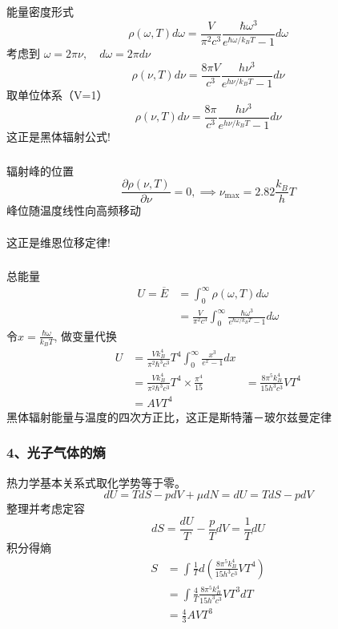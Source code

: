 \begin{frame}
  \frametitle{}
  能量密度形式
  \[ \rho(\omega, T) d \omega = \frac{ V}{\pi ^2c^3} \frac{\hbar\omega^3}{e^{\hbar \omega /k_B T}-1} d \omega\]
  考虑到 $\omega = 2 \pi \nu, \quad d \omega = 2 \pi d\nu $
  \begin{equation*}
    \rho(\nu, T) d \nu=\frac{8 \pi V}{c^{3}} \frac{h \nu^{3}}{e^{h \nu / k_B T}-1} d \nu
  \end{equation*}
  取单位体系（V=1）
  \begin{equation*}
    \rho(\nu, T) d \nu=\frac{8 \pi}{c^{3}} \frac{h \nu^{3}}{e^{h \nu / k_B T}-1} d \nu
  \end{equation*}
  这正是黑体辐射公式!
\end{frame} 

\begin{frame}
  \frametitle{}
  辐射峰的位置
  $$\frac{\partial \rho(\nu, T)}{\partial \nu }  = 0, \implies \nu _{\max } = 2.82 \frac{k_B}{h} T$$
  峰位随温度线性向高频移动\\
  ~~\\ 
  这正是维恩位移定律!
\end{frame} 

\begin{frame}
  \frametitle{}
总能量
\[ \begin{aligned}
  U = \overline{E} &= \int_0^\infty \rho(\omega, T) d \omega \\ 
  &= \frac{ V}{\pi ^2c^3} \int_0^\infty \frac{\hbar\omega^3}{e^{\hbar \omega /k_B T}-1} d \omega
\end{aligned} \]
令$x= \frac{\hbar\omega}{k_B T}$, 做变量代换
\[ \begin{aligned}
  U &= \frac{Vk_B^4}{\pi ^2\hbar^3c^3} T^4 \int_0^\infty \frac{x^3}{e^{x}-1} d x  \\
  &= \frac{Vk_B^4}{\pi ^2\hbar^3c^3} T^4 \times \frac{\pi ^4}{15}
  &= \frac{8\pi ^5 k_B^4}{15 h^3 c^3}V T^4 \\
  &= AVT^4
\end{aligned} \]
黑体辐射能量与温度的四次方正比，这正是斯特藩－玻尔兹曼定律 
\end{frame} 

\begin{frame}
  \frametitle{ 4、光子气体的熵}
  热力学基本关系式取化学势等于零。
  \[ dU = TdS - pdV + \mu dN = dU = TdS - pdV\]
  整理并考虑定容
  \[ dS = \frac{dU}{T} - \frac{p}{T}dV = \frac{1}{T}dU\]
  积分得熵
  \[ \begin{aligned} 
    S &= \int \frac{1}{T} d(\frac{8\pi ^5 k_B^4}{15 h^3 c^3}V T^4) \\
    &= \int \frac{4}{T} \frac{8\pi ^5 k_B^4}{15 h^3 c^3}V T^3 dT \\
    &= \frac{4}{3} AV T^3
  \end{aligned} \]
\end{frame} 

